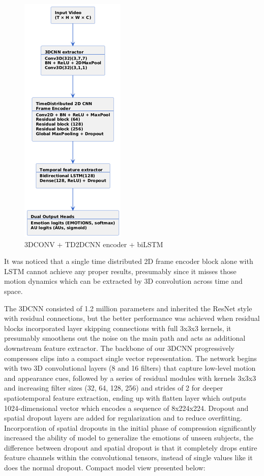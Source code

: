 \documentclass{article}
\begin{document}
\begin{figure}[H]
  \begin{center}
    \includegraphics*[height=0.65\textwidth]{Figures/Picture2.png}
  \end{center}
  \caption{3DCONV + TD2DCNN encoder + biLSTM}
  \label{fig:fig2}
\end{figure}

It was noticed that a single time distributed 2D frame encoder block alone with LSTM cannot achieve any proper results, presumably since it misses those motion dynamics which can be extracted by 3D convolution across time and space.

The 3DCNN consisted of 1.2 million parameters and inherited the ResNet style with residual connections, but the better performance was achieved when residual blocks incorporated layer skipping connections with full 3x3x3 kernels, it presumably smoothens out the noise on the main path and acts as additional downstream feature extractor. The backbone of our 3DCNN progressively compresses clips into a compact single vector representation. The network begins with two 3D convolutional layers (8 and 16 filters) that capture low-level motion and appearance cues, followed by a series of residual modules with kernels 3x3x3 and increasing filter sizes (32, 64, 128, 256) and strides of 2 for deeper spatiotemporal feature extraction, ending up with flatten layer which outputs 1024-dimensional vector which encodes a sequence of 8x224x224. Dropout and spatial dropout layers are added for regularization and to reduce overfitting. Incorporation of spatial dropouts in the initial phase of compression significantly increased the ability of model to generalize the emotions of unseen subjects, the difference between dropout and spatial dropout is that it completely drops entire feature channels within the convolutional tensors, instead of single values like it does the normal dropout. Compact model view presented below:
\end{document}
